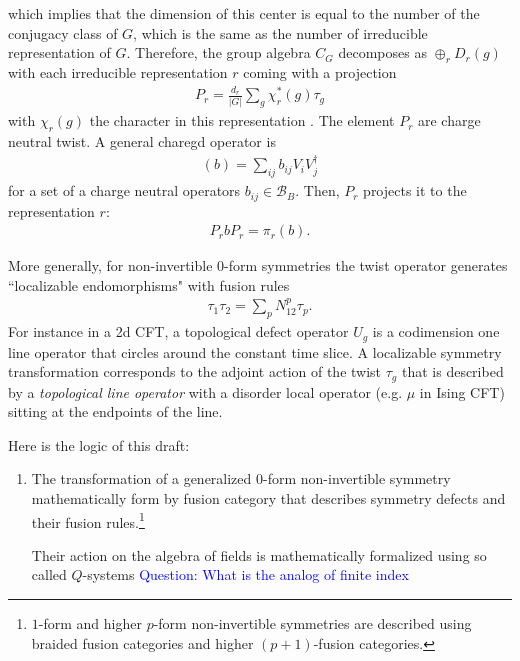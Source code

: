 \documentclass{article}
\newcommand{\mB}{\mathcal{B}}
\theoremstyle{definition}
\newcommand{\NL}[1]{\textcolor{blue}{#1}}
\begin{document}
  which implies that the dimension of this center is equal to the number of the
  conjugacy class of $G$, which is the same as the number of irreducible representation
  of $G$. Therefore, the group algebra $C_{G}$ decomposes as $\oplus_{r}D_{r}(g)$
  with each irreducible representation $r$ coming with a projection
  \begin{align}
    P_{r}=\frac{d_{r}}{|G|}\sum_{g}\chi_{r}^{*}(g)\tau_{g}
  \end{align}
  with $\chi_{r}(g)$ the character in this representation \cite{casini2020eesuperselection}.
  The element $P_{r}$ are charge neutral twist. A general charegd operator is
  \begin{align}
    (b)=\sum_{ij}b_{ij}V_{i}V_{j}^{\dagger}
  \end{align}
  for a set of a charge neutral operators $b_{ij}\in \mB_{B}$. Then, $P_{r}$ projects
  it to the representation $r$:
  \begin{align}
    P_{r}b P_{r}=\pi_{r}(b).
  \end{align}

  More generally, for non-invertible $0$-form symmetries the twist operator
  generates ``localizable endomorphisms" with fusion rules
  \begin{align}
    \tau_{1}\tau_{2}=\sum_{p}N^{p}_{12}\tau_{p}.
  \end{align}
  For instance in a 2d CFT, a topological defect operator $U_{g}$ is a
  codimension one line operator that circles around the constant time slice. A localizable
  symmetry transformation corresponds to the adjoint action of the twist $\tau_{g}$
  that is described by a {\it topological line operator} with a disorder local operator
  (e.g. $\mu$ in Ising CFT) sitting at the endpoints of the line.

  Here is the logic of this draft:

  \begin{enumerate}
    \item The transformation of a generalized $0$-form non-invertible symmetry mathematically
      form by fusion category that describes symmetry defects and their fusion rules.\footnote{$1$-form
      and higher $p$-form non-invertible symmetries are described using braided
      fusion categories and higher $(p+1)$-fusion categories.}

      Their action on the algebra of fields is mathematically formalized using
      so called $Q$-systems \NL{Question: What is the analog of finite index }
  \end{enumerate}
\end{document}
